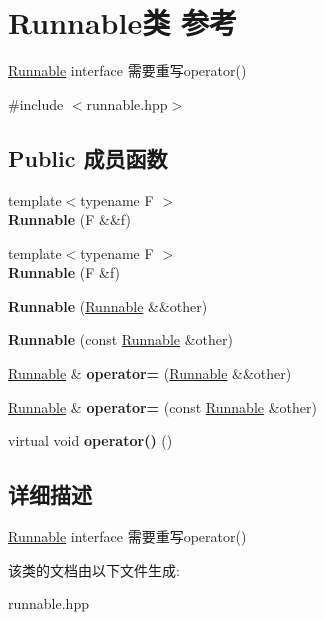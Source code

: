 \hypertarget{classRunnable}{}\section{Runnable类 参考}
\label{classRunnable}


\hyperlink{classRunnable}{Runnable} interface 需要重写operator()  




{\ttfamily \#include $<$runnable.\+hpp$>$}

\subsection*{Public 成员函数}
\begin{DoxyCompactItemize}
\item 
\mbox{\label{classRunnable_ab052afa8b53dd1e7c28e978962839446}} 
{\footnotesize template$<$typename F $>$ }\\{\bfseries Runnable} (F \&\&f)
\item 
\mbox{\label{classRunnable_aaac34b8a861ab506499f8ec791e7cc16}} 
{\footnotesize template$<$typename F $>$ }\\{\bfseries Runnable} (F \&f)
\item 
\mbox{\label{classRunnable_af028c95562f219c2af2439ae69e44755}} 
{\bfseries Runnable} (\hyperlink{classRunnable}{Runnable} \&\&other)
\item 
\mbox{\label{classRunnable_a316ac005c1584a21b458fc673c04aed8}} 
{\bfseries Runnable} (const \hyperlink{classRunnable}{Runnable} \&other)
\item 
\mbox{\label{classRunnable_a3ee19e0ee460449458ca79274908aef3}} 
\hyperlink{classRunnable}{Runnable} \& {\bfseries operator=} (\hyperlink{classRunnable}{Runnable} \&\&other)
\item 
\mbox{\label{classRunnable_aac70062e7bc1f55cc1695fa37d75df53}} 
\hyperlink{classRunnable}{Runnable} \& {\bfseries operator=} (const \hyperlink{classRunnable}{Runnable} \&other)
\item 
\mbox{\label{classRunnable_a38bf849dab4bbb86fc5bc6e7aff383e0}} 
virtual void {\bfseries operator()} ()
\end{DoxyCompactItemize}


\subsection{详细描述}
\hyperlink{classRunnable}{Runnable} interface 需要重写operator() 

该类的文档由以下文件生成\+:\begin{DoxyCompactItemize}
\item 
runnable.\+hpp\end{DoxyCompactItemize}
